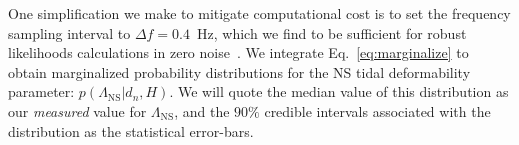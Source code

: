 \documentclass[aps,prd,amsmath,floats,floatfix, twocolumn,
superscriptaddress,nofootinbib,showpacs]{revtex4-1}
\newcommand{\D}{\mathrm{d}}
\newcommand{\lambdans}{\Lambda_\mathrm{NS}}
\newcommand{\LL}{\mathcal{L}}
\begin{document}
% 
% 
% 
% 
One simplification we make to mitigate computational cost is to set the
frequency sampling interval to $\Delta f=0.4$~Hz, which we find to be
sufficient for robust likelihoods calculations in zero noise~\cite{Purrer:2015nkh}.
We integrate
Eq.~\ref{eq:marginalize} to obtain marginalized probability distributions
for the NS tidal deformability parameter: $p(\lambdans|d_n,H)$. We will quote
the median value of this distribution as our {\it measured} value for
$\lambdans$, and the $90\%$ credible intervals associated with the distribution
as the statistical error-bars.
% 
\end{document}
